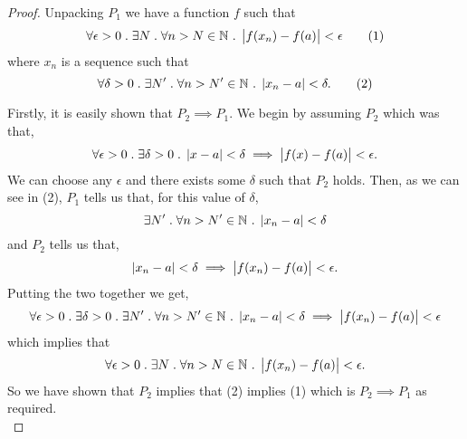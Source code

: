 \documentclass[../MathsNotesBase.tex]{subfiles}
\begin{document}
\begin{proof}
		
		
		Unpacking $P_1$ we have a function $f$ such that
		\[ \forall \epsilon > 0 \;.\; \exists N \;.\; \forall n > N \in \mathbb{N}^{} \;.\; \left\lvert f(x_n) - f(a)\right\rvert < \epsilon \tag{1} \] 
		where $x_n$ is a sequence such that
		\[ \forall \delta > 0 \;.\; \exists N' \;.\; \forall n > N' \in \mathbb{N}^{} \;.\; \left\lvert x_n - a\right\rvert < \delta. \tag{2} \]
		
		\nl[6]
		Firstly, it is easily shown that ${ P_2 \implies P_1 }$. We begin by assuming $P_2$ which was that,
		\[ \forall \epsilon > 0 \;.\; \exists \delta > 0 \;.\; \left\lvert x - a\right\rvert < \delta \implies \left\lvert f(x) - f(a)\right\rvert < \epsilon. \]
		We can choose any $\epsilon$ and there exists some $\delta$ such that $P_2$ holds. Then, as we can see in (2), $P_1$ tells us that, for this value of $\delta$,
		\[ \exists N' \;.\; \forall n > N' \in \mathbb{N}^{} \;.\; \left\lvert x_n - a\right\rvert < \delta \]
		and $P_2$ tells us that,
		\[ \left\lvert x_n - a\right\rvert < \delta \implies \left\lvert f(x_n) - f(a)\right\rvert < \epsilon. \]
		Putting the two together we get,
		\[ \forall \epsilon > 0 \;.\; \exists \delta > 0 \;.\; \exists N' \;.\; \forall n > N' \in \mathbb{N}^{} \;.\; \left\lvert x_n - a\right\rvert < \delta \implies \left\lvert f(x_n) - f(a)\right\rvert < \epsilon \]
		which implies that
		\[ \forall \epsilon > 0 \;.\; \exists N \;.\; \forall n > N \in \mathbb{N}^{} \;.\; \left\lvert f(x_n) - f(a)\right\rvert < \epsilon. \]
		So we have shown that $P_2$ implies that (2) implies (1) which is ${ P_2 \implies P_1 }$ as required.\\
		

\end{proof}
\end{document}
